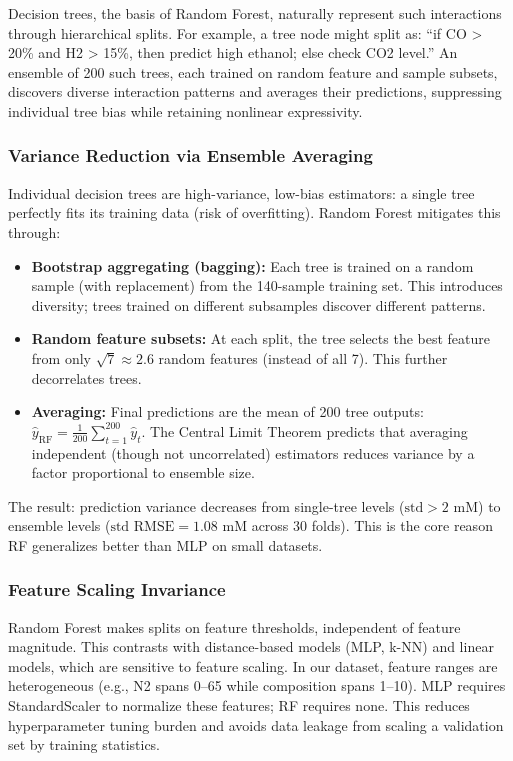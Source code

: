 \documentclass[conference]{IEEEtran}
\begin{document}
Decision trees, the basis of Random Forest, naturally represent such interactions through hierarchical splits. For example, a tree node might split as: ``if CO > 20\% and H2 > 15\%, then predict high ethanol; else check CO2 level.'' An ensemble of 200 such trees, each trained on random feature and sample subsets, discovers diverse interaction patterns and averages their predictions, suppressing individual tree bias while retaining nonlinear expressivity.

\subsubsection{Variance Reduction via Ensemble Averaging}
Individual decision trees are high-variance, low-bias estimators: a single tree perfectly fits its training data (risk of overfitting). Random Forest mitigates this through:
\begin{itemize}
\item \textbf{Bootstrap aggregating (bagging):} Each tree is trained on a random sample (with replacement) from the 140-sample training set. This introduces diversity; trees trained on different subsamples discover different patterns.
\item \textbf{Random feature subsets:} At each split, the tree selects the best feature from only $\sqrt{7} \approx 2.6$ random features (instead of all 7). This further decorrelates trees.
\item \textbf{Averaging:} Final predictions are the mean of 200 tree outputs: $\hat{y}_{\text{RF}} = \frac{1}{200}\sum_{t=1}^{200}\hat{y}_t$. The Central Limit Theorem predicts that averaging independent (though not uncorrelated) estimators reduces variance by a factor proportional to ensemble size.
\end{itemize}

The result: prediction variance decreases from single-tree levels ($\text{std} > 2$ mM) to ensemble levels ($\text{std RMSE} = 1.08$ mM across 30 folds). This is the core reason RF generalizes better than MLP on small datasets.

\subsubsection{Feature Scaling Invariance}
Random Forest makes splits on feature thresholds, independent of feature magnitude. This contrasts with distance-based models (MLP, k-NN) and linear models, which are sensitive to feature scaling. In our dataset, feature ranges are heterogeneous (e.g., N2 spans 0--65 while composition spans 1--10). MLP requires StandardScaler to normalize these features; RF requires none. This reduces hyperparameter tuning burden and avoids data leakage from scaling a validation set by training statistics.
\end{document}
